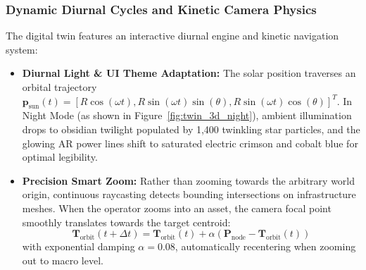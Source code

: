 \documentclass[11pt,a4paper]{article}
\theoremstyle{definition}
\theoremstyle{remark}
\begin{document}
\subsubsection{Dynamic Diurnal Cycles and Kinetic Camera Physics}
The digital twin features an interactive diurnal engine and kinetic navigation system:
\begin{itemize}
    \item \textbf{Diurnal Light & UI Theme Adaptation:} The solar position traverses an orbital trajectory $\mathbf{p}_{\text{sun}}(t) = [R \cos(\omega t), R \sin(\omega t) \sin(\theta), R \sin(\omega t) \cos(\theta)]^T$. In Night Mode (as shown in Figure~\ref{fig:twin_3d_night}), ambient illumination drops to obsidian twilight populated by 1,400 twinkling star particles, and the glowing AR power lines shift to saturated electric crimson and cobalt blue for optimal legibility.
    \item \textbf{Precision Smart Zoom:} Rather than zooming towards the arbitrary world origin, continuous raycasting detects bounding intersections on infrastructure meshes. When the operator zooms into an asset, the camera focal point smoothly translates towards the target centroid:
    \begin{equation}
    \mathbf{T}_{\text{orbit}}(t + \Delta t) = \mathbf{T}_{\text{orbit}}(t) + \alpha \left( \mathbf{P}_{\text{node}} - \mathbf{T}_{\text{orbit}}(t) \right)
    \end{equation}
    with exponential damping $\alpha = 0.08$, automatically recentering when zooming out to macro level.
\end{itemize}
\end{document}
